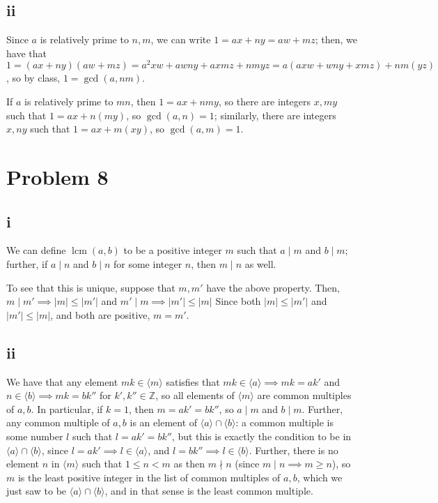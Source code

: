 \documentclass[12pt,letterpaper]{article}
\theoremstyle{definition}
\newcommand{\Z}{\mathbb{Z}}
\DeclareMathOperator{\lcm}{lcm}
\begin{document}
\subsection*{ii}

Since $a$ is relatively prime to $n,m$, we can write $1 = ax + ny = aw + mz$; then, we have that $1 = (ax + ny)(aw + mz) = a^{2}xw + awny + axmz + nmyz = a(axw + wny + xmz) + nm(yz)$, so by class, $1 = \gcd(a, nm)$.

If $a$ is relatively prime to $mn$, then $1 = ax + nmy$, so there are integers $x, my$ such that $1 = ax + n(my)$, so $\gcd(a,n) = 1$; similarly, there are integers $x, ny$ such that $1 = ax + m(xy)$, so $\gcd(a,m) = 1$.

\section*{Problem 8}
\subsection*{i}

We can define $\lcm(a,b)$ to be a positive integer $m$ such that $a \mid m$ and $b \mid m$; further, if $a \mid n$ and $b \mid n$ for some integer $n$, then $m \mid n$ as well.

To see that this is unique, suppose that $m, m'$ have the above property. Then, $m \mid m' \implies |m| \leq |m'|$ and $m' \mid m \implies |m'| \leq |m|$ Since both $|m| \leq |m'|$ and $|m'| \leq |m|$, and both are positive, $m = m'$.

\subsection*{ii}
We have that any element $mk \in \langle m \rangle$ satisfies that $mk \in \langle a \rangle \implies mk = ak'$ and $n \in \langle b \rangle \implies mk = bk''$ for $k', k'' \in \Z$, so all elements of $\langle m \rangle$ are common multiples of $a,b$. In particular, if $k = 1$, then $m = ak' = bk''$, so $a \mid m$ and $b \mid m$. Further, any common multiple of $a, b$ is an element of $\langle a \rangle \cap \langle b \rangle$: a common multiple is some number $l$ such that $l = ak'= bk''$, but this is exactly the condition to be in $\langle a \rangle \cap \langle b \rangle$, since $l = ak' \implies l \in \langle a \rangle$, and $l = bk'' \implies l \in \langle b \rangle$. Further, there is no element $n$ in $\langle m \rangle$ such that $1 \leq n < m$ as then $m \nmid n$ (since $m \mid n \implies m \geq n$), so $m$ is the least positive integer in the list of common multiples of $a,b$, which we just saw to be $\langle a \rangle \cap \langle b \rangle$, and in that sense is the least common multiple.
\end{document}
